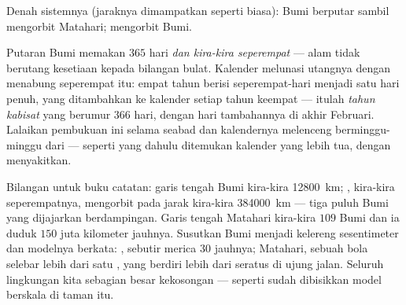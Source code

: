 \begin{omfigure}

{\small Denah sistemnya (jaraknya dimampatkan seperti biasa): Bumi
berputar sambil mengorbit Matahari;  mengorbit Bumi.}
\end{omfigure}

\begin{example}\label{ex:g6:sun-earth-moon:leap}
Putaran Bumi memakan $365$ hari \emph{dan kira-kira seperempat} ---
alam tidak berutang kesetiaan kepada bilangan bulat. Kalender melunasi
utangnya dengan menabung seperempat itu: empat tahun berisi
seperempat-hari menjadi satu hari penuh, yang ditambahkan ke kalender
setiap tahun keempat --- itulah \emph{tahun kabisat} yang berumur
$366$ hari, dengan hari tambahannya di akhir Februari. Lalaikan
pembukuan ini selama seabad dan kalendernya melenceng
berminggu-minggu dari  --- seperti yang dahulu ditemukan
kalender yang lebih tua, dengan menyakitkan.
\end{example}

\begin{example}\label{ex:g6:sun-earth-moon:scale}
Bilangan untuk buku catatan: garis tengah Bumi kira-kira
\qty{12800}{km}; , kira-kira seperempatnya, mengorbit pada jarak
kira-kira \qty{384000}{km} --- tiga puluh Bumi yang dijajarkan
berdampingan. Garis tengah Matahari kira-kira $109$ Bumi dan ia duduk
$150$ juta kilometer jauhnya. Susutkan Bumi menjadi kelereng
sesentimeter dan modelnya berkata: , sebutir merica $30$
 jauhnya; Matahari, sebuah bola selebar lebih dari satu
, yang berdiri lebih dari seratus  di ujung jalan. Seluruh
lingkungan kita sebagian besar kekosongan --- seperti sudah
dibisikkan model berskala  di taman itu.
\end{example}

